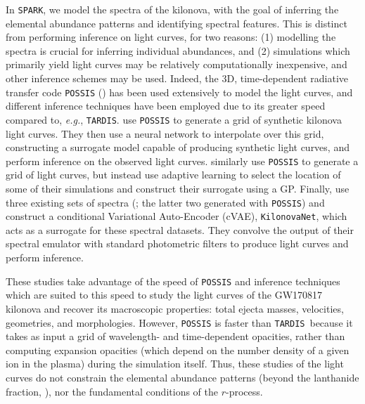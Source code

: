 \documentclass[twocolumn, twocolappendix]{aastex63}
\def\SPARK{\texttt{SPARK}}
\def\TARDIS{\texttt{TARDIS}}
\def\eg{{\it e.g.}}
\begin{document}
In \SPARK, we model the spectra of the kilonova, with the goal of inferring the elemental abundance patterns and identifying spectral features. This is distinct from performing inference on light curves, for two reasons: (1) modelling the spectra is crucial for inferring individual abundances, and (2) simulations which primarily yield light curves may be relatively computationally inexpensive, and other inference schemes may be used. Indeed, the 3D, time-dependent radiative transfer code \texttt{POSSIS} (\citealt{bulla19}) has been used extensively to model the light curves, and different inference techniques have been employed due to its greater speed compared to, \eg, \TARDIS. \cite{almualla21} use \texttt{POSSIS} to generate a grid of synthetic kilonova light curves. They then use a neural network to interpolate over this grid, constructing a surrogate model capable of producing synthetic light curves, and perform inference on the observed light curves. \cite{ristic22} similarly use \texttt{POSSIS} to generate a grid of light curves, but instead use adaptive learning to select the location of some of their simulations and construct their surrogate using a GP. Finally, \cite{lukosiute22} use three existing sets of spectra (\citealt{kasen17, dietrich20, anand21}; the latter two generated with \texttt{POSSIS}) and construct a conditional Variational Auto-Encoder (cVAE), \texttt{KilonovaNet}, which acts as a surrogate for these spectral datasets. They convolve the output of their spectral emulator with standard photometric filters to produce light curves and perform inference. 

These studies take advantage of the speed of \texttt{POSSIS} and inference techniques which are suited to this speed to study the light curves of the GW170817 kilonova and recover its macroscopic properties: total ejecta masses, velocities, geometries, and morphologies. However, \texttt{POSSIS} is faster than \TARDIS~because it takes as input a grid of wavelength- and time-dependent opacities, rather than computing expansion opacities (which depend on the number density of a given ion in the plasma) during the simulation itself. Thus, these studies of the light curves do not constrain the elemental abundance patterns (beyond the lanthanide fraction, \citealt{lukosiute22}), nor the fundamental conditions of the $r$-process.
\end{document}

